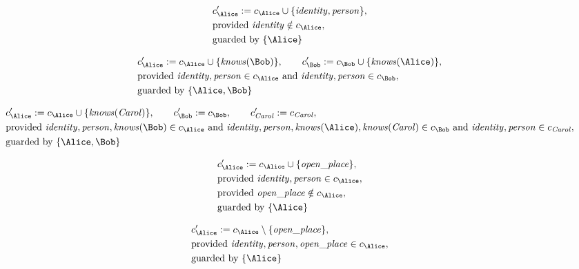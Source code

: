 \begin{align*}
&
c'_
{
\Alice
}
 := 
c_
{
\Alice
}
 \cup 
\{
\mathit{\detokenize{
identity
}}
,
\mathit{\detokenize{
person
}}
\}
,\\
&
\text{provided } 
\mathit{\detokenize{
identity
}}
 \notin c_
{
\Alice
}
,\\
&
\text{guarded by } \{
\Alice
\}
\end{align*}

\begin{align*}
&
c'_
{
\Alice
}
 := 
c_
{
\Alice
}
 \cup 
\{
\mathit{\detokenize{
knows
}}
(
\Bob
)
\}
, \qquad 
c'_
{
\Bob
}
 := 
c_
{
\Bob
}
 \cup 
\{
\mathit{\detokenize{
knows
}}
(
\Alice
)
\}
,\\
&
\text{provided } 
\mathit{\detokenize{
identity
}}
,
\mathit{\detokenize{
person
}}
 \in c_
{
\Alice
}
 \text{ and } 
\mathit{\detokenize{
identity
}}
,
\mathit{\detokenize{
person
}}
 \in c_
{
\Bob
}
,\\
&
\text{guarded by } \{
\Alice
,
\Bob
\}
\end{align*}

\begin{align*}
&
c'_
{
\Alice
}
 := 
c_
{
\Alice
}
 \cup 
\{
\mathit{\detokenize{
knows
}}
(
\mathit{Carol}
)
\}
, \qquad 
c'_
{
\Bob
}
 := 
c_
{
\Bob
}
, \qquad 
c'_
{
\mathit{Carol}
}
 := 
c_
{
\mathit{Carol}
}
,\\
&
\text{provided } 
\mathit{\detokenize{
identity
}}
,
\mathit{\detokenize{
person
}}
,
\mathit{\detokenize{
knows
}}
(
\Bob
)
 \in c_
{
\Alice
}
 \text{ and } 
\mathit{\detokenize{
identity
}}
,
\mathit{\detokenize{
person
}}
,
\mathit{\detokenize{
knows
}}
(
\Alice
)
,
\mathit{\detokenize{
knows
}}
(
\mathit{Carol}
)
 \in c_
{
\Bob
}
 \text{ and } 
\mathit{\detokenize{
identity
}}
,
\mathit{\detokenize{
person
}}
 \in c_
{
\mathit{Carol}
}
,\\
&
\text{guarded by } \{
\Alice
,
\Bob
\}
\end{align*}

\begin{align*}
&
c'_
{
\Alice
}
 := 
c_
{
\Alice
}
 \cup 
\{
\mathit{\detokenize{
open_place
}}
\}
,\\
&
\text{provided } 
\mathit{\detokenize{
identity
}}
,
\mathit{\detokenize{
person
}}
 \in c_
{
\Alice
}
,\\
&
\text{provided } 
\mathit{\detokenize{
open_place
}}
 \notin c_
{
\Alice
}
,\\
&
\text{guarded by } \{
\Alice
\}
\end{align*}

\begin{align*}
&
c'_
{
\Alice
}
 := 
c_
{
\Alice
}
 \setminus 
\{
\mathit{\detokenize{
open_place
}}
\}
,\\
&
\text{provided } 
\mathit{\detokenize{
identity
}}
,
\mathit{\detokenize{
person
}}
,
\mathit{\detokenize{
open_place
}}
 \in c_
{
\Alice
}
,\\
&
\text{guarded by } \{
\Alice
\}
\end{align*}
